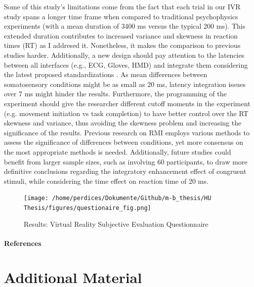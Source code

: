 \documentclass[12pt,oneside,openright]{report}
\begin{document}
Some of this study's limitations come from the fact that each trial in our IVR study spans a longer time frame when compared to traditional psychophysics experiments (with a mean duration of 3400 ms versus the typical 200 ms). This extended duration contributes to increased variance and skewness in reaction times (RT) as I addresed it. Nonetheless, it makes the comparison to previous studies harder.  Additionally, a new design should pay attention to the latencies between all interfaces (e.g., ECG, Gloves, HMD) and integrate them considering the latest proposed standardizations \parencite{vr_respont}. As mean differences between somatosensory conditions might be as small as 20 ms, latency integration issues over 7 ms might hinder the results. Furthermore, the programming of the experiment should give the researcher different cutoff moments in the experiment (e.g. movement initiation vs task completion) to have better control over the RT skewness and variance, thus avoiding the skewness problem and increasing the significance of the results. Previous research on RMI employs various methods to assess the significance of differences between conditions, yet more consensus on the most appropriate methods is needed. Additionally, future studies could benefit from larger sample sizes, such as involving 60 participants, to draw more definitive conclusions regarding the integratory enhancement effect of congruent stimuli, while considering the time effect on reaction time of 20 ms. 
\newpage
\begin{figure}[ht]
        \centering
        \texttt{[image: /home/perdices/Dokumente/Github/m-b\_thesis/HU Thesis/figures/questionaire\_fig.png]}
        \caption{Results: Virtual Reality Subjective Evaluation Questionnaire}
        \label{fig:quest}
\end{figure}
\pagebreak



\paragraph{\textbf{References}}
\printbibliography[heading=none]


\pagebreak
\vspace*{\fill}
\section*{\centering Additional Material}
\vspace*{\fill}
\end{document}
